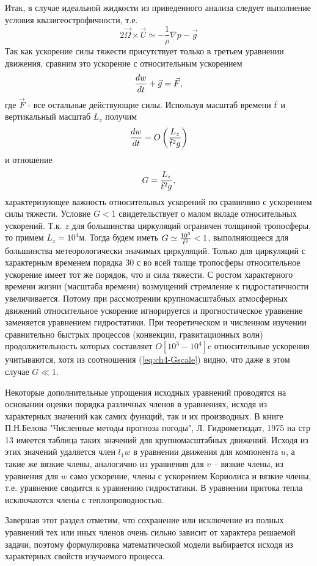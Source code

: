 Итак, в случае идеальной жидкости из приведенного анализа следует выполнение условия квазигеострофичности, т.е.
\[
2\vec{\Omega}\times\vec{U}\simeq -\frac{1}{\rho}\nabla p - \vec{g}
\]
Так как ускорение силы тяжести присутствует только в третьем уравнении движения, сравним это ускорение с относительным ускорением
\[
\displaystyle\frac{d w}{d t}+\vec{g}=\vec{F},
\]
где $\vec{F}$ - все остальные действующие силы. Используя масштаб времени $\Tilde{t}$ и вертикальный масштаб $L_z$ получим
\[
\displaystyle\frac{d w}{d t}=O\left(\frac{L_z}{\Tilde{t}^2g}\right)
\]
и отношение
\begin{equation}
    \label{eq:ch4-Gscale}
    G=\frac{L_z}{\Tilde{t}^2g},
\end{equation}
характеризующее важность относительных ускорений по сравнению с ускорением силы тяжести. Условие $G<1$ свидетельствует о малом вкладе относительных ускорений. Т.к. $z$ для большинства циркуляций ограничен толщиной тропосферы, то примем $L_z=10^4$м. Тогда будем иметь $G \simeq \frac{10^3}{\Tilde{t}^2}<1$, выполняющееся для большинства метеорологически значимых циркуляций. Только для циркуляций с характерным временем порядка 30 с во всей толще тропосферы относительное ускорение имеет тот же порядок, что и сила тяжести. С ростом характерного времени жизни (масштаба времени) возмущений стремление к гидростатичности увеличивается. Потому при рассмотрении крупномасштабных атмосферных движений относительное ускорение игнорируется и прогностическое уравнение заменяется уравнением гидростатики. При теоретическом и численном изучении сравнительно быстрых процессов (конвекции, гравитационных волн) продолжительность которых составляет $O[10^3-10^4]$c относительные ускорения учитываются, хотя из соотношения (\ref{eq:ch4-Gscale}) видно, что даже в этом случае $G\ll1$.

Некоторые дополнительные упрощения исходных уравнений проводятся на основании оценки порядка различных членов в уравнениях, исходя из характерных значений как самих функций, так и их производных. В книге П.Н.Белова "Численные методы прогноза погоды", Л. Гидрометиздат, 1975 на стр 13 имеется таблица таких значений для крупномасштабных движений. Исходя из этих значений удаляется член $l_1w$ в уравнении движения для компонента $u$, а такие же вязкие члены, аналогично из уравнения для $v$ -- вязкие члены, из уравнения для $w$ само ускорение, члены с ускорением Кориолиса и вязкие члены, т.е. уравнение сводится к уравнению гидростатики. В уравнении притока тепла исключаются члены с теплопроводностью. 

Завершая этот раздел отметим, что сохранение или исключение из полных уравнений тех или иных членов очень сильно зависит от характера решаемой задачи, поэтому формулировка математической модели выбирается исходя из характерных свойств изучаемого процесса. 

